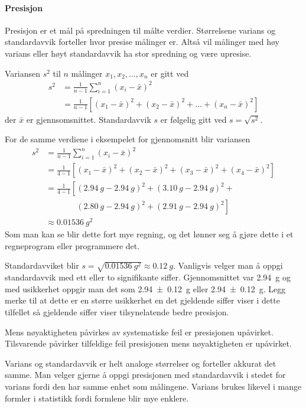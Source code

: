 	\paragraph{Presisjon}
	Presisjon er et mål på spredningen til målte verdier. Størrelsene varians og standardavvik forteller hvor presise målinger er. Altså vil målinger med høy varians eller høyt standardavvik ha stor spredning og være upresise.
	
	Variansen $s^2$ til $n$ målinger $x_1, x_2, \ldots, x_n$ er gitt ved
	\begin{align*}
		s^2 &= \frac{1}{n-1}\sum_{i=1}^{n}(x_i - \bar{x})^2 \\
		&=\frac{1}{n-1}\left[(x_1-\bar{x})^2 + (x_2-\bar{x})^2 + \dots + (x_n-\bar{x})^2\right]
	\end{align*}
	der $\bar{x}$ er gjennsomsnittet. Standardavvik $s$ er følgelig gitt ved	$s=\sqrt{s^2}$.

	For de samme verdiene i eksempelet for gjennomsnitt blir variansen
	\begin{align*}
		s^2 &= \frac{1}{n-1}\sum_{i=1}^{n}(x_i - \bar{x})^2 \\
		&=\frac{1}{4-1}\left[(x_1-\bar{x})^2 + (x_2-\bar{x})^2 + (x_3-\bar{x})^2 + (x_4-\bar{x})^2\right]\\
		&=\frac{1}{4-1}\left[(\SI{2.94}{g}-\SI{2.94}{g})^2 + ( \SI{3.10}{g}-\SI{2.94}{g})^2\right. + \\
		&\phantom{=\frac{1}{4-1}\left[\right.}\left.  (\SI{2.80}{g}-\SI{2.94}{g})^2 + (\SI{2.91}{g}-\SI{2.94}{g})^2\right]\\
		&\approx \SI{0.01536}{g^2}
	\end{align*}
	Som man kan se blir dette fort mye regning, og det lønner seg å gjøre dette i et regneprogram eller programmere det.
	
	Standardavviket blir $s=\sqrt{\SI{0.01536}{g^2}}\approx\SI{0.12}{g}$. Vanligvis velger man å oppgi standardavvik med ett eller to signifikante siffer. Gjennomsnittet var \SI{2.94}{g} og med usikkerhet oppgir man det som \SI{2.94 +- 0.12}{g} eller \SI[separate-uncertainty=true]{2.94 +- 0.12}{g}. Legg merke til at dette er en større usikkerhet en det gjeldende siffer viser i dette tilfellet så gjeldende siffer viser tilsynelatende bedre presisjon.
	
	Mens nøyaktigheten påvirkes av systematiske feil er presisjonen upåvirket. Tilsvarende påvirker tilfeldige feil presisjonen mens nøyaktigheten er upåvirket.
	
	Varians og standardavvik er helt analoge størrelser og forteller akkurat det samme. Man velger gjerne å oppgi presisjonen med standardavvik i stedet for varians fordi den har samme enhet som målingene. Varians brukes likevel i mange formler i statistikk fordi formlene blir mye enklere.
	
